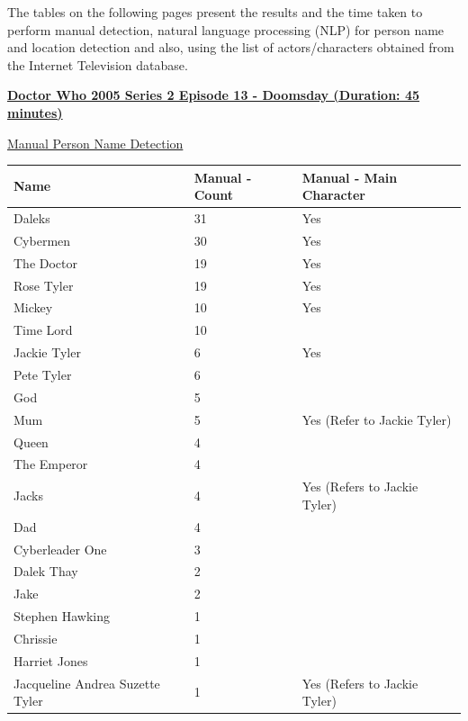The tables on the following pages present the results and the time taken to perform manual detection, natural language processing (NLP) for person name and location detection and also, using the list of actors/characters obtained from the Internet Television database.

\newpage
\textbf{\underline{Doctor Who 2005 Series 2 Episode 13 - Doomsday (Duration: 45 minutes)}}

\underline{Manual Person Name Detection}

\begin{center}
\begin{longtable}{|p{160pt}|p{90pt}|p{140pt}|}
\hline
\textbf{Name}					&\textbf{Manual - Count}	&\textbf{Manual - Main Character}	\\\hline
Daleks						&31				&Yes						\\\hline
Cybermen					&30				&Yes						\\\hline
The Doctor					&19				&Yes						\\\hline
Rose Tyler					&19				&Yes						\\\hline
Mickey						&10				&Yes						\\\hline		
Time Lord					&10				&						\\\hline          
Jackie Tyler					&6				&Yes						\\\hline
Pete Tyler						&6				&						\\\hline	          
God							&5				&						\\\hline	          
Mum							&5				&Yes (Refer to Jackie Tyler)	\\\hline
Queen						&4				&						\\\hline		          
The Emperor					&4				&						\\\hline		          
Jacks						&4				&Yes (Refers to Jackie Tyler)	\\\hline
Dad							&4				&						\\\hline		          
Cyberleader One				&3				&						\\\hline		          
Dalek Thay					&2				&						\\\hline		          
Jake							&2				&						\\\hline		          
Stephen Hawking				&1				&						\\\hline		          
Chrissie						&1				&						\\\hline		          
Harriet Jones					&1				&						\\\hline		          
Jacqueline Andrea Suzette Tyler 	&1				& Yes (Refers to Jackie Tyler)	\\\hline

\end{longtable}
\end{center}
